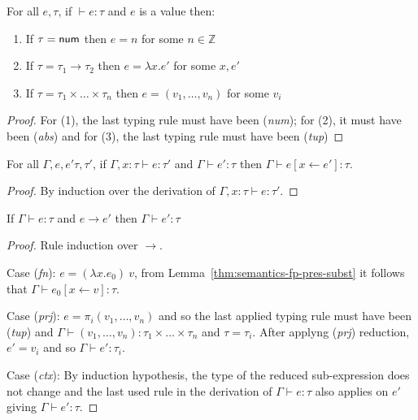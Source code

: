 \begin{lemma}
\label{thm:semantics-fp-canon}
For all $e, \tau$, if $\vdash e : \tau$ and $e$ is a value then:
\begin{enumerate}
  \item If $\tau=\ident{num}$ then $e = n$ for some $n \in \mathbb{Z}$
  \item If $\tau=\tau_1 \rightarrow \tau_2$ then $e = \lambda x.e'$ for some $x, e'$
  \item If $\tau=\tau_1\times\ldots\times\tau_n$ then $e = (v_1, \ldots, v_n)$ for some $v_i$
\end{enumerate}  
\end{lemma}
\begin{proof}
  For (1), the last typing rule must have been (\emph{num}); for (2), it must have been
  (\emph{abs}) and for (3), the last typing rule must have been (\emph{tup})
\end{proof}

\begin{lemma}
\label{thm:semantics-fp-pres-subst}
For all $\Gamma, e, e' \tau, \tau'$, if $\Gamma, x:\tau \vdash e : \tau'$ and $\Gamma \vdash e' : \tau$ 
then $\Gamma \vdash e[x \leftarrow e'] : \tau$.
\end{lemma}
\begin{proof}
By induction over the derivation of $\Gamma, x:\tau \vdash e : \tau'$. 
\end{proof}

\begin{theorem}
\label{thm:semantics-fp-pres}
  If $\Gamma \vdash e : \tau$ and $e \rightarrow e'$ then $\Gamma \vdash e' : \tau$
\end{theorem}
\begin{proof}
  Rule induction over $\rightarrow$.
  
\vspace{0.25em}\noindent\hangindent=0.6cm 
Case (\emph{fn}): $e = (\lambda x.e_0)~v$, from Lemma~\ref{thm:semantics-fp-pres-subst}
  it follows that $\Gamma \vdash e_0[x \leftarrow v] : \tau$.

\vspace{0.25em}\noindent\hangindent=0.6cm 
Case (\emph{prj}): $e = \pi_i(v_1, \ldots, v_n)$ and so the last applied typing rule must have been
  (\emph{tup}) and $\Gamma \vdash (v_1, \ldots, v_n) : \tau_1 \times\ldots\times \tau_n$ and
  $\tau = \tau_i$. After applyng (\emph{prj}) reduction, $e' = v_i$ and so $\Gamma \vdash e' : \tau_i$.
  
\vspace{0.25em}\noindent\hangindent=0.6cm 
Case (\emph{ctx}): By induction hypothesis, the type of the reduced sub-expression does not change
  and the last used rule in the derivation of $\Gamma \vdash e : \tau$ also applies on $e'$
  giving $\Gamma \vdash e' : \tau$.  
\end{proof}

